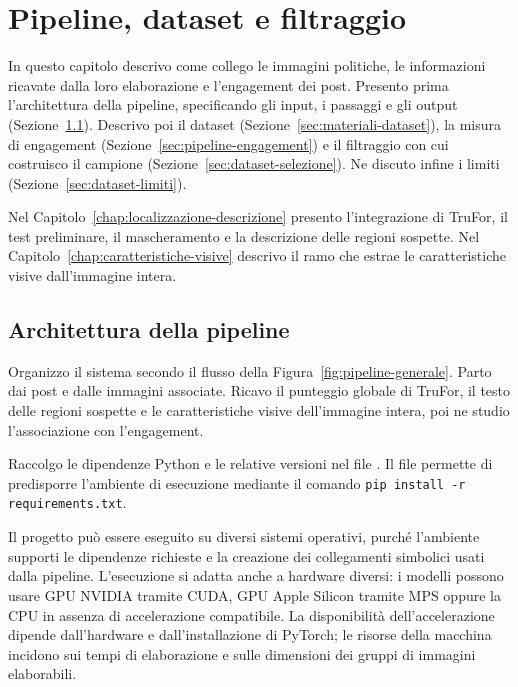 
\chapter{Pipeline, dataset e filtraggio}
\label{chap:dataset}

In questo capitolo descrivo come collego le immagini politiche, le informazioni ricavate dalla loro elaborazione e l'engagement dei post. Presento prima l'architettura della pipeline, specificando gli input, i passaggi e gli output (Sezione~\ref{sec:pipeline-architettura}). Descrivo poi il dataset (Sezione~\ref{sec:materiali-dataset}), la misura di engagement (Sezione~\ref{sec:pipeline-engagement}) e il filtraggio con cui costruisco il campione (Sezione~\ref{sec:dataset-selezione}). Ne discuto infine i limiti (Sezione~\ref{sec:dataset-limiti}).

Nel Capitolo~\ref{chap:localizzazione-descrizione} presento l'integrazione di TruFor, il test preliminare, il mascheramento e la descrizione delle regioni sospette. Nel Capitolo~\ref{chap:caratteristiche-visive} descrivo il ramo che estrae le caratteristiche visive dall'immagine intera.

\section{Architettura della pipeline}
\label{sec:pipeline-architettura}

Organizzo il sistema secondo il flusso della Figura~\ref{fig:pipeline-generale}. Parto dai post e dalle immagini associate. Ricavo il punteggio globale di TruFor, il testo delle regioni sospette e le caratteristiche visive dell’immagine intera, poi ne studio l’associazione con l’engagement.

Raccolgo le dipendenze Python e le relative versioni nel file . Il file permette di predisporre l'ambiente di esecuzione mediante il comando \texttt{pip install -r requirements.txt}.

Il progetto può essere eseguito su diversi sistemi operativi, purché l'ambiente supporti le dipendenze richieste e la creazione dei collegamenti simbolici usati dalla pipeline. L'esecuzione si adatta anche a hardware diversi: i modelli possono usare GPU NVIDIA tramite CUDA, GPU Apple Silicon tramite MPS oppure la CPU in assenza di accelerazione compatibile. La disponibilità dell'accelerazione dipende dall'hardware e dall'installazione di PyTorch; le risorse della macchina incidono sui tempi di elaborazione e sulle dimensioni dei gruppi di immagini elaborabili.

